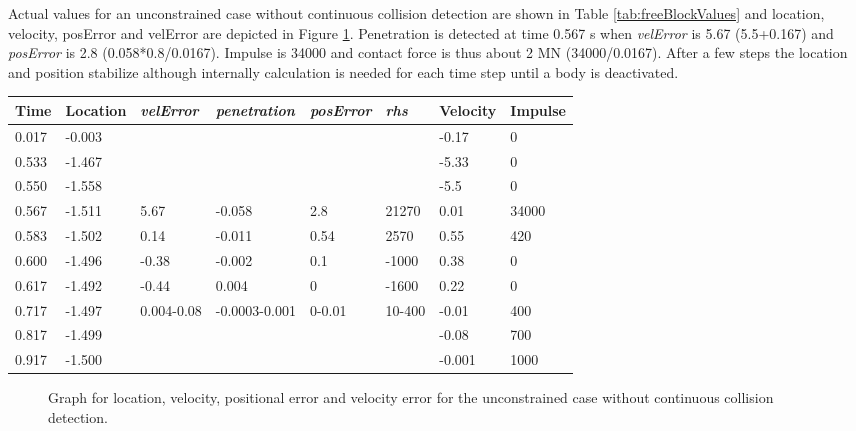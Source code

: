 Actual values for an unconstrained case without continuous collision detection
are shown in Table \ref{tab:freeBlockValues} and 
location, velocity, posError and velError are depicted in Figure \ref{fig:uc}. 
Penetration is detected at time 0.567 s when
{\it velError} is 5.67 (5.5+0.167) and
{\it posError} is 2.8 (0.058*0.8/0.0167). Impulse is 34000 and contact force is thus about 2 MN (34000/0.0167).
After a few steps the location and position stabilize although internally calculation is needed for each time step
until a body is deactivated.

\begin {table*}
 {
\begin{tabular}{|l| l|l| l|l|l|l|l|}
\hline
{\bf Time} & 
{\bf Location} &
{\it velError} & {\it penetration} & {\it posError} & {\it rhs} &
{\bf Velocity} & 
{\bf Impulse} \\  \hline
0.017 &  -0.003 & & & &  &-0.17 & 0 \\  \hline
0.533 &  -1.467 & & & & & -5.33 & 0 \\  \hline
0.550 &  -1.558 & & & & & -5.5 & 0 \\  \hline
0.567 &  -1.511 & 5.67 &-0.058 &2.8 &  21270 & 0.01 & 34000 \\  \hline
0.583 &  -1.502 & 0.14 &-0.011 & 0.54& 2570  & 0.55 & 420 \\  \hline
0.600 &  -1.496 & -0.38&-0.002 & 0.1  & -1000& 0.38 & 0 \\  \hline
0.617 &  -1.492 &-0.44 & 0.004 & 0     & -1600& 0.22 & 0 \\  \hline
0.717 &  -1.497 &0.004-0.08  &-0.0003-0.001 &0-0.01 & 10-400 & -0.01 & 400 \\  \hline
0.817 &  -1.499 & & & & & -0.08 & 700 \\  \hline
0.917 &  -1.500 & & & & & -0.001 & 1000 \\  \hline
\end {tabular}}
\label{tab:freeBlockValues} 
\end {table*}


\begin{figure}

\caption{Graph for location, velocity, positional error and velocity error
for the unconstrained case without continuous collision detection.}
\label{fig:uc}
\end{figure}



